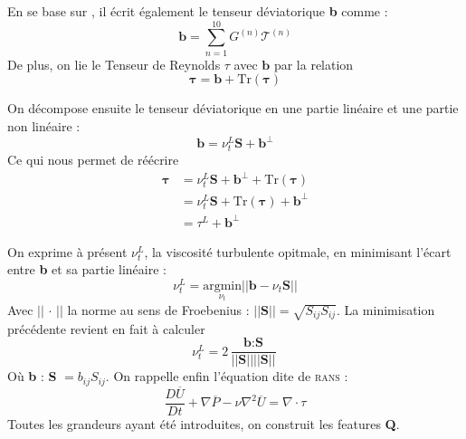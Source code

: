 \documentclass[a4paper,12pt]{report}
\newcommand{\bepar}[1]{
	\left( #1 \right)  
}
\newcommand{\norm}[1]{
	\left \vert \left \vert #1 \right \vert  \right \vert
}
\numberwithin{equation}{section} %
\begin{document}
\noindent En se base sur \cite{pope1975more} , il écrit également le tenseur déviatorique \textbf{b} comme : 
\begin{equation*}
\textbf{b} = \sum_{n=1}^{10} G^{(n)} \mathcal{T}^{(n)}
\end{equation*}
De plus, on lie le Tenseur de Reynolds \textbf{$\tau$} avec $\textbf{b}$ par la relation \begin{equation*}
\mathbf{\tau }= \textbf{b} + \text{Tr}\bepar{\mathbf{\tau}} 
\end{equation*}

\noindent On décompose ensuite le tenseur déviatorique en une partie linéaire et une partie non linéaire :
\begin{equation*}
\textbf{b} = \nu_t^L\textbf{S} + \textbf{b}^\perp
\end{equation*}
Ce qui nous permet de réécrire 
\begin{align*}
\mathbf{\tau }&= \nu_t^L\textbf{S} + \textbf{b}^\perp + \text{Tr}\bepar{\mathbf{\tau}} \\
&= \nu_t^L\textbf{S} + \text{Tr}\bepar{\mathbf{\tau}}  + \textbf{b}^\perp \\
&= \tau^L + \textbf{b}^\perp
\end{align*}

\noindent On exprime à présent $\nu_t^L$, la viscosité turbulente opitmale, en minimisant l'écart entre \textbf{b} et sa partie linéaire : $$\nu_t^L = \underset{\nu_t}{\text{argmin}} \norm{\textbf{b} - \nu_t\textbf{S}} $$
Avec $\norm{\, \cdot \, }$ la norme au sens de Froebenius : $\norm{\textbf{S}} = \sqrt{S_{ij}S_{ij}}$. La minimisation précédente revient en fait à calculer $$ \nu_t^L = 2\,  \frac{\textbf{b}:\textbf{S}}{\norm{\textbf{S}} \norm{\textbf{S}}}$$ Où \textbf{b} : \textbf{S} $= b_{ij}S_{ij}$.
On rappelle enfin l'équation dite de \textsc{rans} :
$$ \frac{D\overline{U} }{Dt} + \nabla \overline{P} - \nu \nabla^2 \overline{U} = \nabla \cdot \tau$$
\noindent Toutes les grandeurs ayant été introduites, on construit les features \textbf{Q}.\\[2mm]
\end{document}
